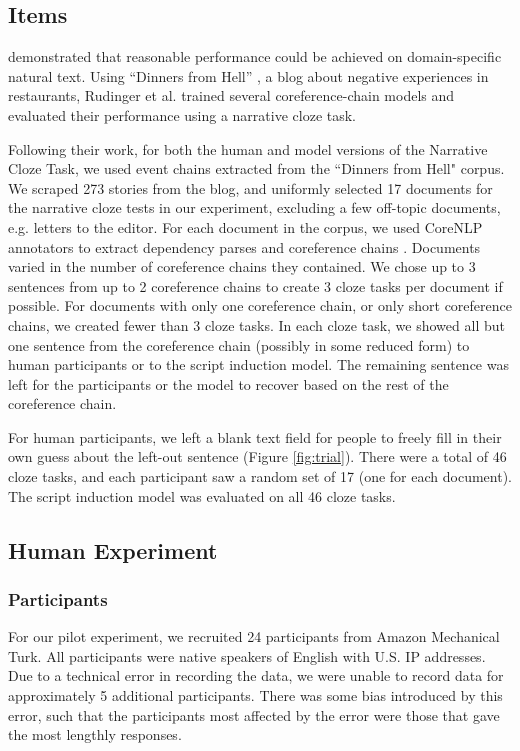 \documentclass[10pt,a4paper]{article}
\begin{document}
\subsection{Items}

 demonstrated that reasonable performance could be achieved on domain-specific natural text.
Using ``Dinners from Hell'' \cite{dinnersfromhell}, a blog about negative experiences in restaurants, Rudinger et al. trained several coreference-chain models and evaluated their performance using a narrative cloze task.

Following their work, for both the human and model versions of the Narrative Cloze Task, we used event chains extracted from the ``Dinners from Hell" corpus.
We scraped 273 stories from the blog, and uniformly selected 17 documents for the narrative cloze tests in our experiment, excluding a few off-topic documents, e.g. letters to the editor.
For each document in the corpus, we used CoreNLP annotators \cite{corenlp} to extract dependency parses \cite{depparse} and coreference chains \cite{coref2013a, coref2013b, coref2011, coref2010}.
Documents varied in the number of coreference chains they contained.
We chose up to 3 sentences from up to 2 coreference chains to create 3 cloze tasks per document if possible.
For documents with only one coreference chain, or only short coreference chains, we created fewer than 3 cloze tasks. 
In each cloze task, we showed all but one sentence from the coreference chain (possibly in some reduced form) to human participants or to the script induction model.
The remaining sentence was left for the participants or the model to recover based on the rest of the coreference chain.

For human participants, we left a blank text field for people to freely fill in their own guess about the left-out sentence (Figure \ref{fig:trial}).
There were a total of 46 cloze tasks, and each participant saw a random set of 17 (one for each document).
The script induction model was evaluated on all 46 cloze tasks.

\subsection{Human Experiment}

\subsubsection{Participants}

For our pilot experiment, we recruited
24 participants from Amazon Mechanical Turk.
All participants were native speakers of English with U.S. IP addresses.
Due to a technical error in recording the data, we were unable to record data for approximately 5 additional participants.
There was some bias introduced by this error, such that the participants most affected by the error were those that gave the most lengthly responses.
\end{document}
